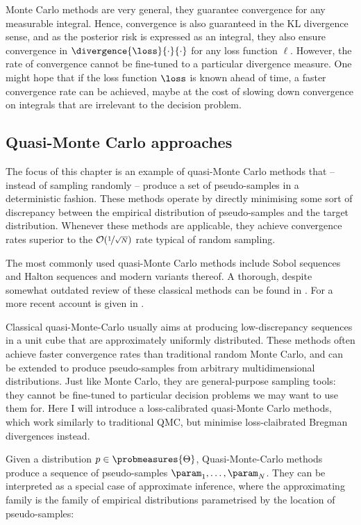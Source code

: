 Monte Carlo methods are very general, they guarantee convergence for any measurable integral. Hence, convergence is also guaranteed in the KL divergence sense, and as the posterior risk is expressed as an integral, they also ensure convergence in $\divergence{\loss}{\cdot}{\cdot}$ for any loss function $\ell$. However, the rate of convergence cannot be fine-tuned to a particular divergence measure. One might hope that if the loss function $\loss$ is known ahead of time, a faster convergence rate can be achieved, maybe at the cost of slowing down convergence on integrals that are irrelevant to the decision problem.

\subsection{Quasi-Monte Carlo approaches}

The focus of this chapter is an example of quasi-Monte Carlo methods that -- instead of sampling randomly -- produce a set of pseudo-samples in a deterministic fashion. These methods operate by directly minimising some sort of discrepancy between the empirical distribution of pseudo-samples and the target distribution. Whenever these methods are applicable, they achieve convergence rates superior to the $\mathcal{O}(\nicefrac{1}{\sqrt{N}})$ rate typical of random sampling.

The most commonly used quasi-Monte Carlo methods include Sobol sequences \citep{Sobol1967,Sobol1998} and Halton sequences \citep{Halton1964} and modern variants thereof. A thorough, despite somewhat outdated review of these classical methods can be found in \citep{Niederreiter1992}. For a more recent account is given in \citep{Lemieux2009}.

Classical quasi-Monte-Carlo usually aims at producing low-discrepancy sequences in a unit cube that are approximately uniformly distributed. These methods often achieve faster convergence rates than traditional random Monte Carlo, and can be extended to produce pseudo-samples from arbitrary multidimensional distributions. Just like Monte Carlo, they are general-purpose sampling tools: they cannot be fine-tuned to particular decision problems we may want to use them for. Here I will introduce a loss-calibrated quasi-Monte Carlo methods, which work similarly to traditional QMC, but minimise loss-claibrated Bregman divergences instead.

Given a distribution $p\in\probmeasures{\Theta}$, Quasi-Monte-Carlo methods produce a sequence of pseudo-samples $\param_1,\ldots,\param_N$. They can be interpreted as a special case of approximate inference, where the approximating family is the family of empirical distributions parametrised by the location of pseudo-samples:

